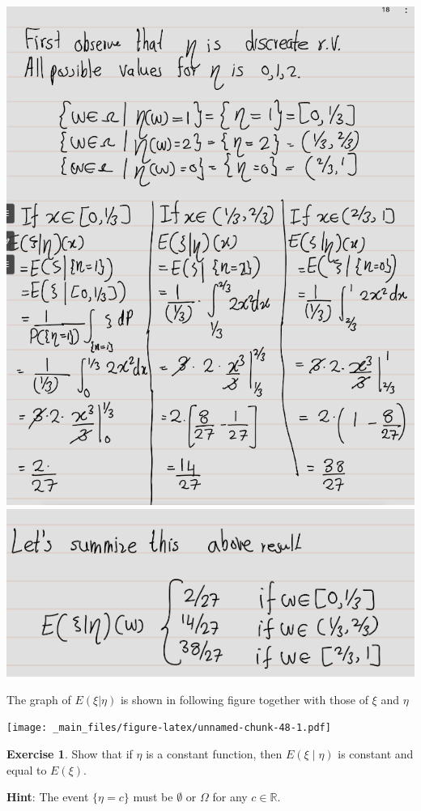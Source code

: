 \documentclass[
]{book}
\theoremstyle{definition}
\theoremstyle{definition}
\theoremstyle{definition}
\newtheorem{exercise}{Exercise}[chapter]
\theoremstyle{definition}
\theoremstyle{remark}
\begin{document}
\includegraphics[width=18cm,height=\textheight]{fig/fig eg2.3-1.png}
\includegraphics[width=18cm,height=\textheight]{fig/fig eg2.3-2.png}

The graph of \(E(\xi|\eta)\) is shown in following figure together with those of \(\xi\) and \(\eta\)

\texttt{[image: \_main\_files/figure-latex/unnamed-chunk-48-1.pdf]}

\begin{exercise}
\protect\hypertarget{exr:unnamed-chunk-49}{}\label{exr:unnamed-chunk-49}Show that if \(\eta\) is a constant function, then \(E(\xi \mid \eta)\) is constant and equal to \(E(\xi)\).

\textbf{Hint}: The event \(\{\eta = c\}\) must be \(\emptyset\) or \(\Omega\) for any \(c \in \mathbb{R}\).
\end{exercise}
\end{document}

